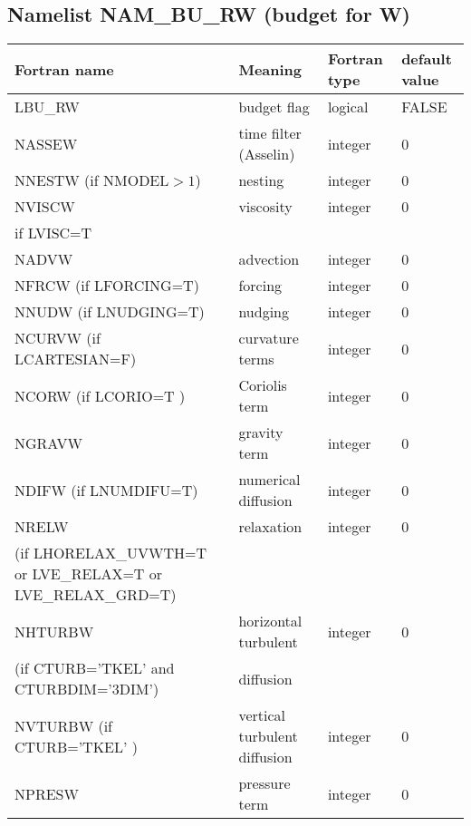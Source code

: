 \subsection{Namelist NAM\_BU\_RW (budget for W)}

\begin{longtable} {|p{}|p{}|>{\centering}p{}|p{}<{\centering}|}
\hline
Fortran name & Meaning & Fortran type & default value \\
\hline \hline
\endhead
LBU\_RW  & budget flag & logical & FALSE\index{LBU\_RW!\innam{NAM\_BU\_RW}} \\\hline
NASSEW   & time filter (Asselin)   & integer  &  0 \index{NASSEW!\innam{NAM\_BU\_RW}} \\\hline
NNESTW (if NMODEL$>1$) & nesting           & integer  &  0 \index{NNESTW!\innam{NAM\_BU\_RW}} \\\hline
NVISCW   & viscosity         & integer  &  0 \index{NVISCW!\innam{NAM\_BU\_RW}}\\
if LVISC=T &  &   &   \\\hline
NADVW   & advection & integer  &  0 \index{NADVW!\innam{NAM\_BU\_RW}}\\\hline
NFRCW (if LFORCING=T)   & forcing           & integer  &  0 \index{NFRCW!\innam{NAM\_BU\_RW}} \\\hline
NNUDW (if LNUDGING=T)   & nudging           & integer  &  0 \index{NNUDW!\innam{NAM\_BU\_RW}} \\\hline
NCURVW (if LCARTESIAN=F)  & curvature terms   & integer  &  0 \index{NCURVW!\innam{NAM\_BU\_RW}}\\\hline
NCORW (if LCORIO=T )   & Coriolis  term    & integer  &  0 \index{NCORW!\innam{NAM\_BU\_RW}}\\\hline
NGRAVW   & gravity  term     & integer  &  0 \index{NGRAVW!\innam{NAM\_BU\_RW}}\\\hline
NDIFW (if LNUMDIFU=T)   & numerical diffusion & integer  &  0 \index{NDIFW!\innam{NAM\_BU\_RW}}\\\hline
NRELW    & relaxation        & integer  &  0 \index{NRELW!\innam{NAM\_BU\_RW}}\\ \nopagebreak
(if LHORELAX\_UVWTH=T or LVE\_RELAX=T or LVE\_RELAX\_GRD=T) &  &   &   \\\hline
NHTURBW  & horizontal turbulent & integer  &  0 \index{NHTURBW!\innam{NAM\_BU\_RW}}\\ \nopagebreak
(if CTURB='TKEL' and CTURBDIM='3DIM') &diffusion &   &  \\\hline
NVTURBW (if CTURB='TKEL' )  & vertical turbulent diffusion & integer  &  0 \index{NVTURBW!\innam{NAM\_BU\_RW}}\\\hline
NPRESW   & pressure term       & integer  &  0 \index{NPRESW!\innam{NAM\_BU\_RW}}  \\\hline
\end{longtable}

